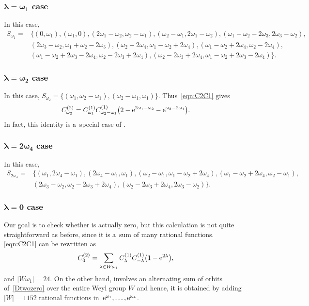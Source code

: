 \documentclass[pdftex]{sigma}
\numberwithin{equation}{section}
\theoremstyle{definition}
\newcommand\la{\lambda}
\begin{document}
\subsubsection[lambda=omega\_1 case]{$\boldsymbol{\la=\omega_1}$ case}
In this case,
\begin{align*}
S_{\omega_1}={}&
\{
 (0,\omega _1), (\omega _1,0),
 (2 \omega _1-\omega _2,\omega _2-\omega _1), (\omega _2-\omega _1,2 \omega _1-\omega _2),
 (\omega _1+\omega _2-2 \omega _3,2 \omega _3-\omega _2), \\
& (2 \omega _3-\omega _2,\omega _1+\omega _2-2 \omega _3),
 (\omega _2-2 \omega _4,\omega _1-\omega _2+2 \omega _4), (\omega _1-\omega _2+2 \omega _4,\omega _2-2 \omega _4), \\
& (\omega _1-\omega _2+2 \omega _3-2 \omega _4,\omega _2-2 \omega _3+2 \omega _4), (\omega _2-2 \omega _3+2 \omega _4,\omega_1-\omega _2+2 \omega _3-2 \omega _4)
\}.
\end{align*}

\subsubsection[lambda=omega\_2 case]{$\boldsymbol{\la=\omega_2}$ case}
In this case, $S_{\omega_2} = \{(\omega _1,\omega _2-\omega _1), (\omega _2-\omega _1,\omega _1)\}$.
Thus~\eqref{eqn:C2C1} gives
\[
C^{(2)}_{\omega_2} = C_{\omega _1}^{(1)} C_{\omega _2-\omega _1}^{(1)}\bigl(2-{\rm e}^{2\omega_1-\omega_2}-{\rm e}^{\omega_2-2\omega_1}\bigr).
\]
In fact, this identity is a~special case of \cite[Corollary~3.5]{MR4283572}.

\subsubsection[lambda=2omega\_4 case]{$\boldsymbol{\la=2\omega_4}$ case}
In this case,
\begin{align*}
S_{2\omega_4} ={}&
\{
 (\omega _1,2 \omega _4-\omega _1), (2 \omega _4-\omega _1,\omega _1),
 (\omega _2-\omega _1,\omega _1-\omega _2+2 \omega _4),
 (\omega _1-\omega _2+2 \omega _4,\omega _2-\omega _1),\\
 &(2 \omega _3-\omega _2,\omega _2-2 \omega _3+2 \omega _4), (\omega _2-2 \omega _3+2 \omega _4,2 \omega _3-\omega _2)
\}.
\end{align*}

\subsubsection[lambda=0 case]{$\boldsymbol{\la=0}$ case}
Our goal is to check whether  is actually zero, but this calculation is not quite straightforward as before, since it is a~sum of many rational functions.
\eqref{eqn:C2C1} can be rewritten as
\[
C^{(2)}_{0} = \sum_{\la\in W\omega_1}C^{(1)}_{\la}C^{(1)}_{-\la}\bigl(1-{\rm e}^{2\la}\bigr),
\]
and $|W\omega_1| = 24$. On the other hand,  involves an alternating sum of orbits of~\eqref{Dtwozero} over the entire Weyl group $W$ and hence, it is obtained by adding $|W|=1152$ rational functions in~${{\rm e}^{\omega_1},\dots,{\rm e}^{\omega_4}}$.
\end{document}
